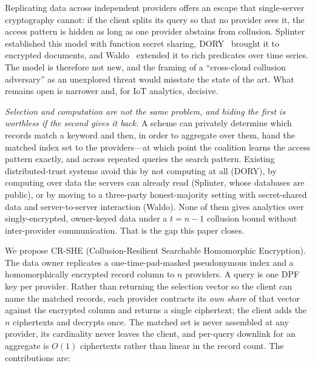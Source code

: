 \documentclass[journal]{IEEEtran}
\begin{document}
Replicating data across independent providers offers an escape that single-server cryptography cannot: if the client splits its query so that no provider sees it, the access pattern is hidden as long as one provider abstains from collusion. Splinter~\cite{splinter} established this model with function secret sharing, DORY~\cite{dory} brought it to encrypted documents, and Waldo~\cite{waldo} extended it to rich predicates over time series. The model is therefore not new, and the framing of a ``cross-cloud collusion adversary'' as an unexplored threat would misstate the state of the art. What remains open is narrower and, for IoT analytics, decisive.

\emph{Selection and computation are not the same problem, and hiding the first is worthless if the second gives it back.} A scheme can privately determine which records match a keyword and then, in order to aggregate over them, hand the matched index set to the providers---at which point the coalition learns the access pattern exactly, and across repeated queries the search pattern. Existing distributed-trust systems avoid this by not computing at all (DORY), by computing over data the servers can already read (Splinter, whose databases are public), or by moving to a three-party honest-majority setting with secret-shared data and server-to-server interaction (Waldo). None of them gives analytics over singly-encrypted, owner-keyed data under a $t=n-1$ collusion bound without inter-provider communication. That is the gap this paper closes.

We propose CR-SHE (Collusion-Resilient Searchable Homomorphic Encryption). The data owner replicates a one-time-pad-masked pseudonymous index and a homomorphically encrypted record column to $n$ providers. A query is one DPF key per provider. Rather than returning the selection vector so the client can name the matched records, each provider contracts its \emph{own share} of that vector against the encrypted column and returns a single ciphertext; the client adds the $n$ ciphertexts and decrypts once. The matched set is never assembled at any provider, its cardinality never leaves the client, and per-query downlink for an aggregate is $O(1)$ ciphertexts rather than linear in the record count. The contributions are:
\end{document}
